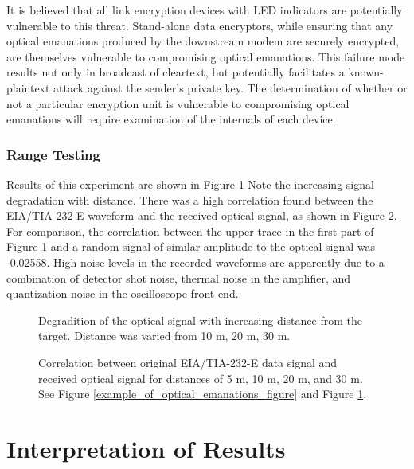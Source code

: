 \documentclass[twocolumn]{article}
\begin{document}
It is believed that all link encryption devices with LED indicators are potentially vulnerable to this threat.  Stand-alone data encryptors, while ensuring that any optical emanations produced by the downstream modem are securely encrypted, are themselves vulnerable to compromising optical emanations.  This failure mode results not only in broadcast of cleartext, but potentially facilitates a known-plaintext attack against the sender’s private key.  The determination of whether or not a particular encryption unit is vulnerable to compromising optical emanations will require examination of the internals of each device.

\subsubsection{Range Testing}

Results of this experiment are shown in Figure \ref{three_captures_in_a_row}  Note the increasing signal degradation with distance.  There was a high correlation found between the EIA/TIA-232-E waveform and the received optical signal, as shown in Figure \ref{correlation_figure}.  For comparison, the correlation between the upper trace in the first part of Figure \ref{three_captures_in_a_row} and a random signal of similar amplitude to the optical signal was -0.02558.  High noise levels in the recorded waveforms are apparently due to a combination of detector shot noise, thermal noise in the amplifier, and quantization noise in the oscilloscope front end. 

\begin{figure}[htbp]
\centerline{\epsfysize=1.5in }
\caption{Degradition of the optical signal with increasing distance
from the target.  Distance was varied from 10 m, 20 m, 30 m.}
\label{three_captures_in_a_row}
\end{figure}

\begin{figure}[htbp]
\centerline{\epsfysize=1.5in }
\caption{Correlation between original EIA/TIA-232-E data signal and
received optical signal for distances of 5 m, 10 m, 20 m, and 30 m.  See
Figure \ref{example_of_optical_emanations_figure} and Figure \ref{three_captures_in_a_row}.}
\label{correlation_figure}
\end{figure}

\section{Interpretation of Results}
\end{document}

